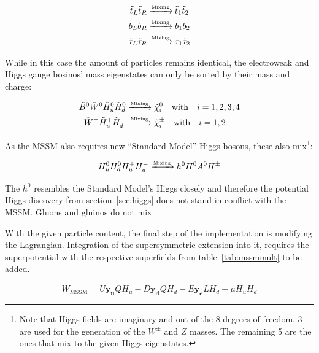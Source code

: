 \begin{align}
  \label{eq:3fammix}
  \tilde{t}_L \tilde{t}_R & \xrightarrow{\text{\tiny{Mixing}}} \tilde{t}_1 \tilde{t}_2 \\
  \tilde{b}_L \tilde{b}_R & \xrightarrow{\text{\tiny{Mixing}}} \tilde{b}_1 \tilde{b}_2 \\
  \tilde{\tau}_L \tilde{\tau}_R & \xrightarrow{\text{\tiny{Mixing}}} \tilde{\tau}_1 \tilde{\tau}_2
\end{align}

\noindent While in this case the amount of particles remains identical, the electroweak and Higgs gauge bosinos' mass eigenstates can only be sorted by their mass and charge:

\begin{align}
  \label{eq:ewhsusymix}
  \tilde{B}^0 \tilde{W}^0 \tilde{H}^0_u \tilde{H}^0_d & \xrightarrow{\text{\tiny{Mixing}}} \tilde{\chi}^0_i \quad \text{with} \quad i = 1,2,3,4 \\
  \tilde{W}^\pm \tilde{H}^+_u \tilde{H}^-_d & \xrightarrow{\text{\tiny{Mixing}}} \tilde{\chi}^\pm_i \quad \text{with} \quad i = 1,2
\end{align}

\noindent As the MSSM also requires new ``Standard Model'' Higgs bosons, these also mix\footnote{Note that Higgs fields are imaginary and out of the 8 degrees of freedom, 3 are used for the generation of the $W^\pm$ and $Z$ masses. The remaining 5 are the ones that mix to the given Higgs eigenstates.}:

\begin{equation}
  \label{eq:hmix}
  H^0_u H^0_d H^+_u H^-_d \xrightarrow{\text{\tiny{Mixing}}} h^0 H^0 A^0 H^\pm
\end{equation}

\noindent The $h^0$ resembles the Standard Model's Higgs closely and therefore the potential Higgs discovery from section~\ref{sec:higgs} does not stand in conflict with the MSSM. Gluons and gluinos do not mix.

With the given particle content, the final step of the implementation is modifying the Lagrangian. Integration of the supersymmetric extension into it, requires the superpotential with the respective superfields from table~\ref{tab:mssmmult} to be added.

\begin{equation}
  \label{eq:mssmsuperpot}
  W_{\text{MSSM}} = \bar{U} \mathbf{y_u} Q H_u - \bar{D} \mathbf{y_d} Q H_d - \bar{E} \mathbf{y_e} L H_d + \mu H_u H_d
\end{equation}


